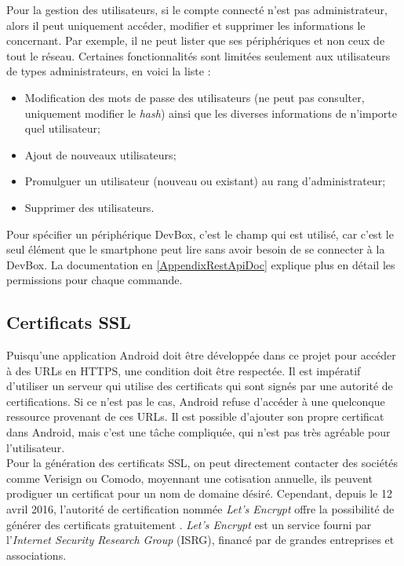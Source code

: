 Pour la gestion des utilisateurs, si le compte connecté n'est pas administrateur, alors il peut uniquement accéder, modifier et supprimer les informations le concernant. Par exemple, il ne peut lister que ses périphériques et non ceux de tout le réseau. Certaines fonctionnalités sont limitées seulement aux utilisateurs de types administrateurs, en voici la liste : 
\begin{itemize}
    \item Modification des mots de passe des utilisateurs (ne peut pas consulter, uniquement modifier le \textit{hash}) ainsi que les diverses informations de n'importe quel utilisateur;
    \item Ajout de nouveaux utilisateurs;
    \item Promulguer un utilisateur (nouveau ou existant) au rang d'administrateur;
    \item Supprimer des utilisateurs. \\
\end{itemize}


Pour spécifier un périphérique DevBox, c'est le champ  qui est utilisé, car c'est le seul élément que le smartphone peut lire sans avoir besoin de se connecter à la DevBox. La documentation en \cref{AppendixRestApiDoc} explique plus en détail les permissions pour chaque commande.



\subsection{Certificats SSL}

Puisqu'une application Android doit être développée dans ce projet pour accéder à des URLs en HTTPS, une condition doit être respectée. Il est impératif d'utiliser un serveur qui utilise des certificats qui sont signés par une autorité de certifications. Si ce n'est pas le cas, Android refuse d'accéder à une quelconque ressource provenant de ces URLs. Il est possible d'ajouter son propre certificat dans Android, mais c'est une tâche compliquée, qui n'est pas très agréable pour l'utilisateur. \\

Pour la génération des certificats SSL, on peut directement contacter des sociétés comme Verisign ou Comodo, moyennant une cotisation annuelle, ils peuvent prodiguer un certificat pour un nom de domaine désiré. Cependant, depuis le 12 avril 2016, l'autorité de certification nommée \textit{Let's Encrypt} offre la possibilité de générer des certificats gratuitement \cite{LetsEncr96:online}. \textit{Let's Encrypt} est un service fourni par l’\textit{Internet Security Research Group} (ISRG), financé par de grandes entreprises et associations. \\

